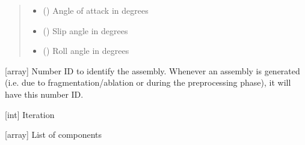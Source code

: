 \documentclass[letterpaper,10pt,english]{sphinxmanual}
\begin{document}
\begin{fulllineitems}
\begin{fulllineitems}
\begin{quote}
\begin{description}
\begin{itemize}
\item {} 
\sphinxAtStartPar
{} () \textendash{} Angle of attack in degrees

\item {} 
\sphinxAtStartPar
{} () \textendash{} Slip angle in degrees

\item {} 
\sphinxAtStartPar
{} () \textendash{} Roll angle in degrees

\end{itemize}

\end{description}\end{quote}

\end{fulllineitems}


\begin{fulllineitems}
\label{\detokenize{modules:assembly.Assembly_list.id}}
\pysigstartsignatures
{}
\pysigstopsignatures
\sphinxAtStartPar
{[}array{]} Number ID to identify the assembly. Whenever an assembly is generated (i.e. due to fragmentation/ablation or during the preprocessing phase), it will have this number ID.

\end{fulllineitems}


\begin{fulllineitems}
\label{\detokenize{modules:assembly.Assembly_list.iter}}
\pysigstartsignatures
{}
\pysigstopsignatures
\sphinxAtStartPar
{[}int{]} Iteration

\end{fulllineitems}


\begin{fulllineitems}
\label{\detokenize{modules:assembly.Assembly_list.objects}}
\pysigstartsignatures
{}
\pysigstopsignatures
\sphinxAtStartPar
{[}array{]} List of components


\end{fulllineitems}
\end{fulllineitems}
\end{document}
